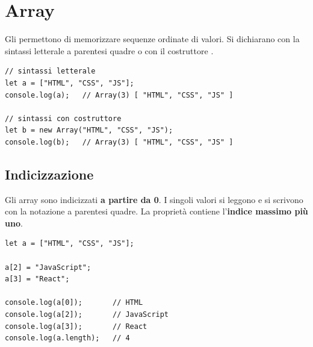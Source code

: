 \section{Array}

Gli  permettono di memorizzare sequenze ordinate di valori. Si
dichiarano con la sintassi letterale a parentesi quadre o con il costruttore
.

\begin{affianco}[0.55][c]
\begin{lstlisting}[style=js, name=array.js]
// sintassi letterale
let a = ["HTML", "CSS", "JS"];
console.log(a);   // Array(3) [ "HTML", "CSS", "JS" ]

// sintassi con costruttore
let b = new Array("HTML", "CSS", "JS");
console.log(b);   // Array(3) [ "HTML", "CSS", "JS" ]
\end{lstlisting}
\risultato
\begin{immagine}
\end{immagine}
\end{affianco}

\subsection{Indicizzazione}

Gli array sono indicizzati \textbf{a partire da 0}. I singoli valori si leggono
e si scrivono con la notazione a parentesi quadre. La proprietà 
contiene l'\textbf{indice massimo più uno}.

\begin{affianco}[0.55][c]
\begin{lstlisting}[style=js, name=indici.js]
let a = ["HTML", "CSS", "JS"];

a[2] = "JavaScript";
a[3] = "React";

console.log(a[0]);       // HTML
console.log(a[2]);       // JavaScript
console.log(a[3]);       // React
console.log(a.length);   // 4
\end{lstlisting}
\risultato
\begin{immagine}
\end{immagine}
\end{affianco}

